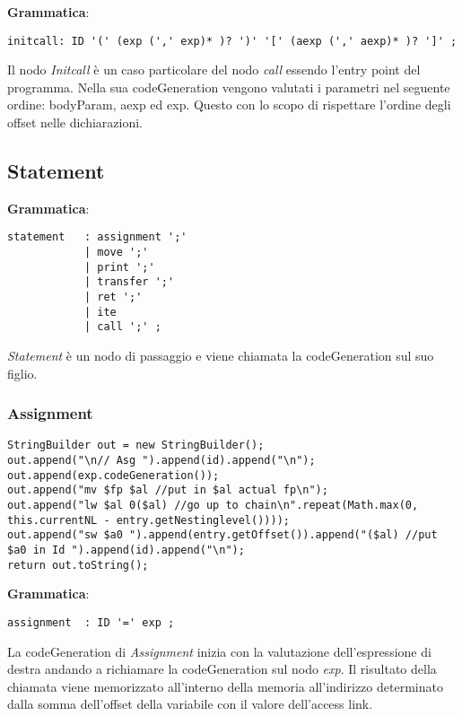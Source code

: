 \documentclass[12pt,twoside,openright,a4paper]{report}
\begin{document}
\textbf{Grammatica}:
\begin{lstlisting}
initcall: ID '(' (exp (',' exp)* )? ')' '[' (aexp (',' aexp)* )? ']' ;
\end{lstlisting}
Il nodo \textit{Initcall} è un caso particolare del nodo \textit{call} essendo l'entry point del programma.
Nella sua codeGeneration vengono valutati i parametri nel seguente ordine: bodyParam, aexp ed exp. Questo con lo scopo di rispettare l'ordine degli offset nelle dichiarazioni.

\newpage
\subsection{Statement}
\textbf{Grammatica}:
\begin{lstlisting}
statement   : assignment ';'
            | move ';'     
            | print ';'
            | transfer ';' 
            | ret ';'
            | ite 
            | call ';' ;
\end{lstlisting}
\textit{Statement} è un nodo di passaggio e viene chiamata la codeGeneration sul suo figlio.
\subsubsection{Assignment }
\begin{lstlisting}
StringBuilder out = new StringBuilder();
out.append("\n// Asg ").append(id).append("\n");
out.append(exp.codeGeneration());
out.append("mv $fp $al //put in $al actual fp\n");
out.append("lw $al 0($al) //go up to chain\n".repeat(Math.max(0, this.currentNL - entry.getNestinglevel())));
out.append("sw $a0 ").append(entry.getOffset()).append("($al) //put $a0 in Id ").append(id).append("\n");
return out.toString();
\end{lstlisting}
\textbf{Grammatica}:
\begin{lstlisting}
assignment  : ID '=' exp ;
\end{lstlisting}
La codeGeneration di \textit{Assignment} inizia con la valutazione dell'espressione di destra andando a richiamare la codeGeneration sul nodo \textit{exp}.
Il risultato della chiamata viene memorizzato all'interno della memoria all'indirizzo determinato dalla somma dell'offset della variabile con il valore dell'access link.
\end{document}
